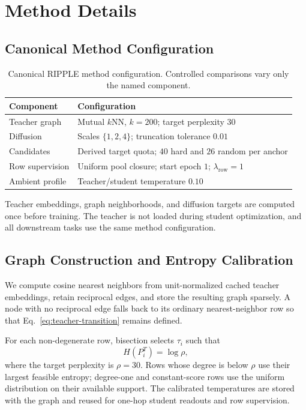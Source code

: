 \section{Method Details}
\label{app:method-details}

\subsection{Canonical Method Configuration}

\begin{table}[t]
\centering
\small
\setlength{\tabcolsep}{5pt}
\begin{tabular}{ll}
\toprule
Component & Configuration \\
\midrule
Teacher graph & Mutual $k$NN, $k=200$; target perplexity $30$ \\
Diffusion & Scales $\{1,2,4\}$; truncation tolerance $0.01$ \\
Candidates & Derived target quota; $40$ hard and $26$ random per anchor \\
Row supervision & Uniform pool closure; start epoch $1$; $\lambda_{\mathrm{row}}=1$ \\
Ambient profile & Teacher/student temperature $0.10$ \\
\bottomrule
\end{tabular}
\caption{Canonical RIPPLE method configuration. Controlled comparisons vary only the named component.}
\label{tab:ripple-config}
\end{table}

Teacher embeddings, graph neighborhoods, and diffusion targets are computed once before training. The teacher is not loaded during student optimization, and all downstream tasks use the same method configuration.

\subsection{Graph Construction and Entropy Calibration}
\label{app:entropic-bandwidth}

We compute cosine nearest neighbors from unit-normalized cached teacher embeddings, retain reciprocal edges, and store the resulting graph sparsely. A node with no reciprocal edge falls back to its ordinary nearest-neighbor row so that Eq.~\eqref{eq:teacher-transition} remains defined.

For each non-degenerate row, bisection selects $\tau_i$ such that
\begin{equation}
H(P_i^T)=\log\rho,
\end{equation}
where the target perplexity is $\rho=30$. Rows whose degree is below $\rho$ use their largest feasible entropy; degree-one and constant-score rows use the uniform distribution on their available support. The calibrated temperatures are stored with the graph and reused for one-hop student readouts and row supervision.

